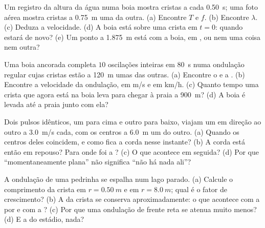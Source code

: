 \begin{exercise}[$\star\star\star$]\label{exo:g12:mechanical-waves:12}
Um registro da altura da água numa boia mostra cristas a cada
\qty{0.50}{s}; uma foto aérea mostra cristas a \qty{0.75}{m} uma da
outra. (a) Encontre $T$ e $f$. (b) Encontre $\lambda$. (c) Deduza a
velocidade. (d) A boia está sobre uma crista em $t = 0$: quando estará de
novo? (e) Um ponto a \qty{1.875}{m} está  com a boia, em , ou nem uma coisa nem outra?
\end{exercise}

\begin{exercise}[$\star\star\star$]\label{exo:g12:mechanical-waves:13}
Uma boia ancorada completa $10$ oscilações inteiras em \qty{80}{s} numa
ondulação regular cujas cristas estão a \qty{120}{m} umas das outras.
(a) Encontre o  e a . (b) Encontre a velocidade da
ondulação, em \unit{m/s} e em \unit{km/h}. (c) Quanto tempo uma crista
que agora está na boia leva para chegar à praia a \qty{900}{m}? (d) A
boia é levada até a praia junto com ela?
\end{exercise}

\begin{exercise}[$\star\star\star$]\label{exo:g12:mechanical-waves:14}
Dois pulsos idênticos, um para cima e outro para baixo, viajam um em
direção ao outro a \qty{3.0}{m/s} cada, com os centros a \qty{6.0}{m} um
do outro. (a) Quando os centros deles coincidem, e como fica a corda
nesse instante? (b) A corda está então em repouso? Para onde foi a
? (c) O que acontece em seguida? (d) Por que ``momentaneamente
plana'' não significa ``não há nada ali''?
\end{exercise}

\begin{exercise}[$\star\star\star$]\label{exo:g12:mechanical-waves:15}
A ondulação de uma pedrinha se espalha num lago parado. (a) Calcule o
comprimento da crista em $r = \qty{0.50}{m}$ e em $r = \qty{8.0}{m}$;
qual é o fator de crescimento? (b) A  da crista se conserva
aproximadamente: o que acontece com a  por  e com a
? (c) Por que uma ondulação de frente reta se atenua muito
menos? (d) E a  do estádio, nada?
\end{exercise}

